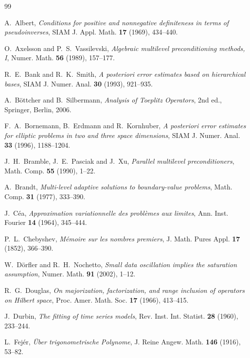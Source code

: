 \documentclass[11pt,a4paper]{article}
\theoremstyle{plain}
\theoremstyle{definition}
\begin{document}
\begin{thebibliography}{99}\small

 A.~Albert,
\emph{Conditions for positive and nonnegative definiteness in terms of pseudoinverses},
SIAM J. Appl. Math. \textbf{17} (1969), 434--440.

 O.~Axelsson and P.~S.~Vassilevski,
\emph{Algebraic multilevel preconditioning methods, I},
Numer. Math. \textbf{56} (1989), 157--177.

 R.~E.~Bank and R.~K.~Smith,
\emph{A posteriori error estimates based on hierarchical bases},
SIAM J. Numer. Anal. \textbf{30} (1993), 921--935.

 A.~B\"ottcher and B.~Silbermann,
\emph{Analysis of Toeplitz Operators}, 2nd ed., Springer, Berlin, 2006.

 F.~A.~Bornemann, B.~Erdmann and R.~Kornhuber,
\emph{A posteriori error estimates for elliptic problems in two and three space
dimensions}, SIAM J. Numer. Anal. \textbf{33} (1996), 1188--1204.

 J.~H.~Bramble, J.~E.~Pasciak and J.~Xu,
\emph{Parallel multilevel preconditioners},
Math. Comp. \textbf{55} (1990), 1--22.

 A.~Brandt,
\emph{Multi-level adaptive solutions to boundary-value problems},
Math. Comp. \textbf{31} (1977), 333--390.

 J.~C\'ea,
\emph{Approximation variationnelle des probl\`emes aux limites},
Ann. Inst. Fourier \textbf{14} (1964), 345--444.

 P.~L.~Chebyshev,
\emph{M\'emoire sur les nombres premiers},
J. Math. Pures Appl. \textbf{17} (1852), 366--390.

 W.~D\"orfler and R.~H.~Nochetto,
\emph{Small data oscillation implies the saturation assumption},
Numer. Math. \textbf{91} (2002), 1--12.

 R.~G.~Douglas,
\emph{On majorization, factorization, and range inclusion of operators on Hilbert
space}, Proc. Amer. Math. Soc. \textbf{17} (1966), 413--415.

 J.~Durbin,
\emph{The fitting of time series models},
Rev. Inst. Int. Statist. \textbf{28} (1960), 233--244.

 L.~Fej\'er,
\emph{\"Uber trigonometrische Polynome},
J. Reine Angew. Math. \textbf{146} (1916), 53--82.


\end{thebibliography}
\end{document}
